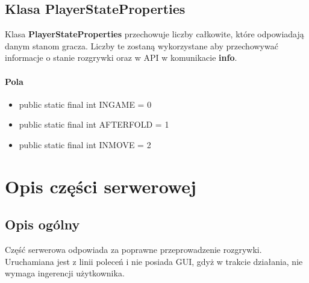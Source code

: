 \documentclass{article}
\begin{document}
    \subsection{Klasa PlayerStateProperties}
        Klasa \textbf{PlayerStateProperties} przechowuje liczby całkowite, które odpowiadają danym stanom gracza.
        Liczby te zostaną wykorzystane aby przechowywać informacje o stanie rozgrywki oraz w API w komunikacie \textbf{info}.
        \paragraph{Pola}
            \begin{itemize}
                \item public static final int INGAME = 0
                \item public static final int AFTERFOLD = 1
                \item public static final int INMOVE = 2
            \end{itemize}

\section{Opis części serwerowej}
    \subsection{Opis ogólny}
        Część serwerowa odpowiada za poprawne przeprowadzenie rozgrywki.
        Uruchamiana jest z linii poleceń i nie posiada GUI, gdyż w trakcie działania, nie wymaga ingerencji użytkownika.
    
\end{document}
